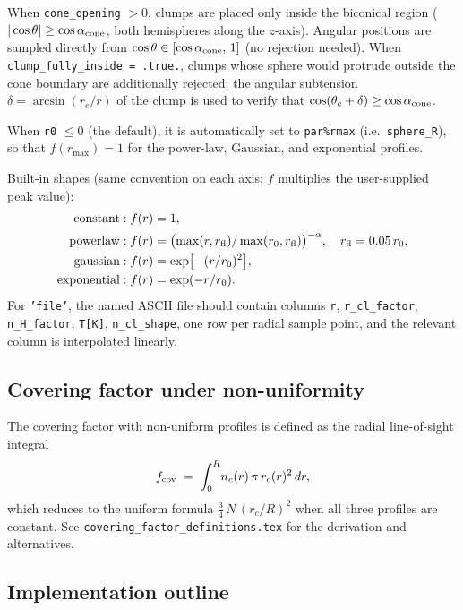 \documentclass[english,a4paper]{my_memo}
\begin{document}
When \texttt{cone\_opening} $> 0$, clumps are placed only inside the
biconical region ($|\cos\theta| \ge \cos\alpha_{\rm cone}$, both
hemispheres along the $z$-axis).  Angular positions are sampled
directly from $\cos\theta \in [\cos\alpha_{\rm cone},\,1]$ (no
rejection needed).  When \texttt{clump\_fully\_inside = .true.}, clumps
whose sphere would protrude outside the cone boundary are additionally
rejected: the angular subtension $\delta = \arcsin(r_c/r)$ of the clump
is used to verify that
$\cos(\theta_c + \delta) \ge \cos\alpha_{\rm cone}$.

When \texttt{r0} $\leq 0$ (the default), it is automatically set to
\texttt{par\%rmax} (i.e.\ \texttt{sphere\_R}), so that $f(r_\mathrm{max})=1$
for the power-law, Gaussian, and exponential profiles.

Built-in shapes (same convention on each axis; $f$ multiplies the
user-supplied peak value):
\begin{align*}
\text{constant}    &: f(r) = 1, \\
\text{powerlaw}    &: f(r) = \bigl(\max(r,r_{\rm fl})/\max(r_0,r_{\rm fl})\bigr)^{-\alpha},
                       \quad r_{\rm fl} = 0.05\,r_0, \\
\text{gaussian}    &: f(r) = \exp\bigl[-(r/r_0)^2\bigr], \\
\text{exponential} &: f(r) = \exp(-r/r_0).
\end{align*}
For \texttt{'file'}, the named ASCII file should contain
columns \texttt{r}, \texttt{r\_cl\_factor}, \texttt{n\_H\_factor},
\texttt{T[K]}, \texttt{n\_cl\_shape}, one row per radial sample point, and
the relevant column is interpolated linearly.

\subsection{Covering factor under non-uniformity}

The covering factor with non-uniform profiles is defined as the radial
line-of-sight integral
\begin{equation}
   f_{\rm cov} \;=\; \int_{0}^{R}\!  n_{c}(r)\,\pi\,r_{c}(r)^{2}\,dr,
\end{equation}
which reduces to the uniform formula $\tfrac{3}{4}\,N\,(r_{c}/R)^{2}$
when all three profiles are constant. See
\texttt{covering\_\hspace{0pt}factor\_\hspace{0pt}definitions.tex}
for the derivation and alternatives.

\subsection{Implementation outline}
\end{document}
